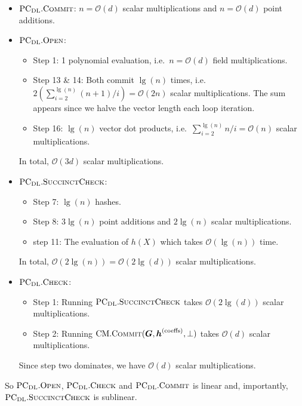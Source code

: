 \documentclass[
]{article}
\providecommand{\tightlist}{%
  \setlength{\itemsep}{0pt}\setlength{\parskip}{0pt}}
\newcommand*\Oc{\mathcal{O}}
\renewcommand{\vec}[1]{ \boldsymbol{#1} }
\newcommand*{\Commit}{\mathrm{\text{C{\scriptsize OMMIT}}}}
\newcommand*{\PCDL}{\text{PC}_{\text{DL}}}
\newcommand*{\PCDLCommit}{\PCDL.\Commit}
\newcommand*{\PCDLOpen}{\PCDL.\mathrm{\text{O\scriptsize PEN}}}
\newcommand*{\PCDLSuccinctCheck}{\PCDL.\mathrm{\text{S{\scriptsize UCCINCT}C{\scriptsize HECK}}}}
\newcommand*{\PCDLCheck}{\PCDL.\mathrm{\text{C\scriptsize HECK}}}
\newcommand*{\CM}{\mathrm{\text{CM}}}
\newcommand*{\CMCommit}{\CM.\Commit}
\begin{document}
\begin{itemize}
\tightlist
\item
  \(\PCDLCommit\): \(n = \Oc(d)\) scalar multiplications and
  \(n = \Oc(d)\) point additions.
\item
  \(\PCDLOpen\):

  \begin{itemize}
  \tightlist
  \item
    Step 1: 1 polynomial evaluation, i.e.~\(n = \Oc(d)\) field
    multiplications.
  \item
    Step 13 \& 14: Both commit \(\lg(n)\) times,
    i.e.~\(2 (\sum_{i=2}^{\lg(n)} (n+1)/i) = \Oc(2n)\) scalar
    multiplications. The sum appears since we halve the vector length
    each loop iteration.
  \item
    Step 16: \(\lg(n)\) vector dot products,
    i.e.~\(\sum_{i=2}^{\lg(n)} n/i = \Oc(n)\) scalar multiplications.
  \end{itemize}

  In total, \(\Oc(3d)\) scalar multiplications.
\item
  \(\PCDLSuccinctCheck\):

  \begin{itemize}
  \tightlist
  \item
    Step 7: \(\lg(n)\) hashes.
  \item
    Step 8: \(3 \lg(n)\) point additions and \(2 \lg(n)\) scalar
    multiplications.
  \item
    step 11: The evaluation of \(h(X)\) which takes \(\Oc(\lg(n))\)
    time.
  \end{itemize}

  In total, \(\Oc(2 \lg(n)) = \Oc(2 \lg(d))\) scalar multiplications.
\item
  \(\PCDLCheck\):

  \begin{itemize}
  \tightlist
  \item
    Step 1: Running \(\PCDLSuccinctCheck\) takes \(\Oc(2 \lg(d))\)
    scalar multiplications.
  \item
    Step 2: Running
    \(\CMCommit(\vec{G}, \vec{h}^{\text{(coeffs)}}, \bot)\) takes
    \(\Oc(d)\) scalar multiplications.
  \end{itemize}

  Since step two dominates, we have \(\Oc(d)\) scalar multiplications.
\end{itemize}

So \(\PCDLOpen\), \(\PCDLCheck\) and \(\PCDLCommit\) is linear and,
importantly, \(\PCDLSuccinctCheck\) is sublinear.
\end{document}

